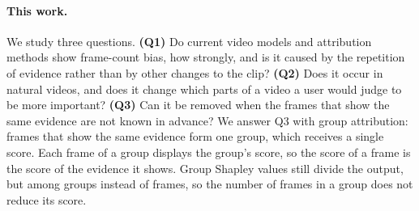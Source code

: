 \paragraph{This work.}
We study three questions.
\textbf{(Q1)} Do current video models and attribution methods show frame-count bias, how strongly, and is it caused by the repetition of evidence rather than by other changes to the clip?
\textbf{(Q2)} Does it occur in natural videos, and does it change which parts of a video a user would judge to be more important?
\textbf{(Q3)} Can it be removed when the frames that show the same evidence are not known in advance?
We answer Q3 with group attribution: frames that show the same evidence form one group, which receives a single score.
Each frame of a group displays the group's score, so the score of a frame is the score of the evidence it shows.
Group Shapley values still divide the output, but among groups instead of frames, so the number of frames in a group does not reduce its score.
